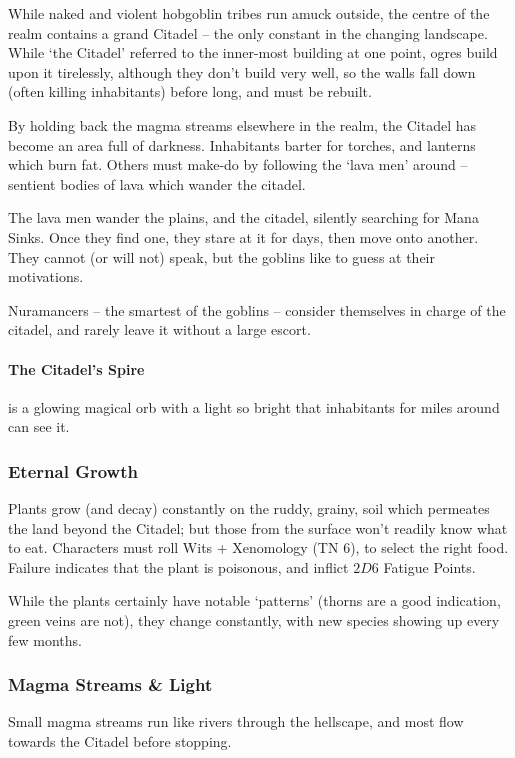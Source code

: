 \begin{multicols}{2}
While naked and violent hobgoblin tribes run amuck outside, the centre of the realm contains a grand Citadel -- the only constant in the changing landscape.
While `the Citadel' referred to the inner-most building at one point, ogres build upon it tirelessly, although they don't build very well, so the walls fall down (often killing inhabitants) before long, and must be rebuilt.

By holding back the magma streams elsewhere in the realm, the Citadel has become an area full of darkness.
Inhabitants barter for torches, and lanterns which burn fat.
Others must make-do by following the `lava men' around -- sentient bodies of lava which wander the citadel.

The lava men wander the plains, and the citadel, silently searching for Mana Sinks.
Once they find one, they stare at it for days, then move onto another.
They cannot (or will not) speak, but the goblins like to guess at their motivations.

Nuramancers -- the smartest of the goblins -- consider themselves in charge of the citadel, and rarely leave it without a large escort.

\paragraph{The Citadel's Spire}
is a glowing magical orb with a light so bright that inhabitants for miles around can see it.

\subsubsection{Eternal Growth}

Plants grow (and decay) constantly on the ruddy, grainy, soil which permeates the land beyond the Citadel; but those from the surface won't readily know what to eat.
Characters must roll Wits + Xenomology (TN 6), to select the right food.
Failure indicates that the plant is poisonous, and inflict $2D6$ Fatigue Points.

While the plants certainly have notable `patterns' (thorns are a good indication, green veins are not), they change constantly, with new species showing up every few months.

\subsubsection{Magma Streams \& Light}

Small magma streams run like rivers through the hellscape, and most flow towards the Citadel before stopping.


\end{multicols}
